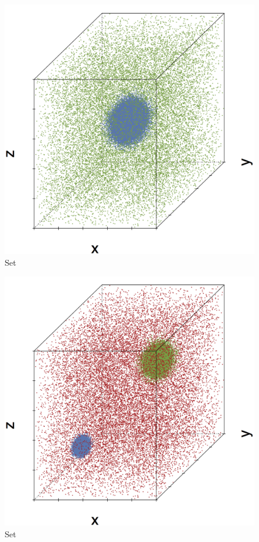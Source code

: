 \begin{subfigure}{0.3\textwidth}
	\centering
	\includegraphics[width=\textwidth]{3/img/datasetplot_ferdosi_1_60000.png}
	\caption{Set \ferdosiOne}
	\label{fig:3:simulated:datasets:ferdosi1}
\end{subfigure}
\begin{subfigure}{0.3\textwidth}
	\centering
	\includegraphics[width=\textwidth]{3/img/datasetplot_ferdosi_2_60000.png}
	\caption{Set \ferdosiTwo}
	\label{fig:3:simulated:datasets:ferdosi2}
\end{subfigure}	
